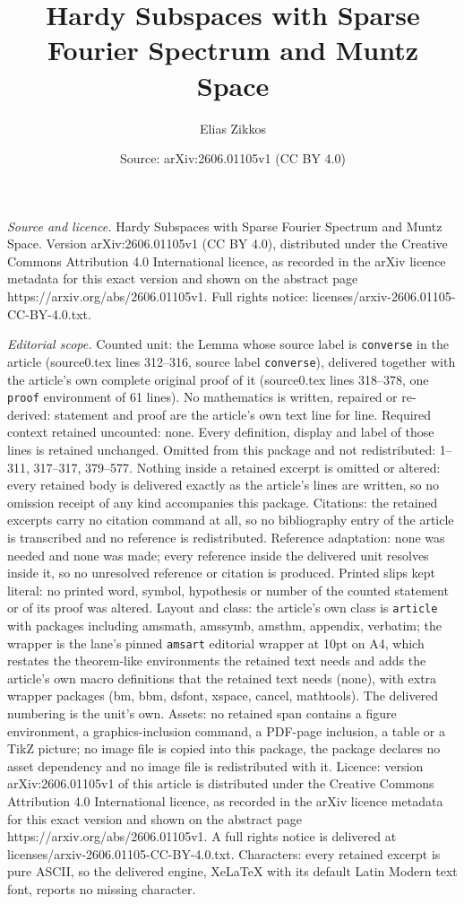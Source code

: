 \documentclass[10pt,a4paper]{amsart}
\title[Hardy Subspaces with Sparse Fourier Spectrum and Muntz Space]{Hardy Subspaces with Sparse Fourier Spectrum and Muntz Space}
\author{Elias Zikkos}
\date{Source: arXiv:2606.01105v1 (CC BY 4.0)}
\begin{document}
\maketitle

\noindent\emph{Source and licence.} Hardy Subspaces with Sparse Fourier Spectrum and Muntz Space. Version arXiv:2606.01105v1 (CC BY 4.0), distributed under the Creative Commons Attribution 4.0 International licence, as recorded in the arXiv licence metadata for this exact version and shown on the abstract page https://arxiv.org/abs/2606.01105v1. Full rights notice: licenses/arxiv-2606.01105-CC-BY-4.0.txt.\par\smallskip

\noindent\textit{Editorial scope.} Counted unit: the Lemma whose source label is \texttt{converse} in the article (source0.tex lines 312--316, source label \texttt{converse}), delivered together with the article's own complete original proof of it (source0.tex lines 318--378, one \texttt{proof} environment of 61 lines). No mathematics is written, repaired or re-derived: statement and proof are the article's own text line for line. Required context retained uncounted: none. Every definition, display and label of those lines is retained unchanged. Omitted from this package and not redistributed: 1--311, 317--317, 379--577. Nothing inside a retained excerpt is omitted or altered: every retained body is delivered exactly as the article's lines are written, so no omission receipt of any kind accompanies this package. Citations: the retained excerpts carry no citation command at all, so no bibliography entry of the article is transcribed and no reference is redistributed. Reference adaptation: none was needed and none was made; every reference inside the delivered unit resolves inside it, so no unresolved reference or citation is produced. Printed slips kept literal: no printed word, symbol, hypothesis or number of the counted statement or of its proof was altered. Layout and class: the article's own class is \texttt{article} with packages including amsmath, amssymb, amsthm, appendix, verbatim; the wrapper is the lane's pinned \texttt{amsart} editorial wrapper at 10pt on A4, which restates the theorem-like environments the retained text needs and adds the article's own macro definitions that the retained text needs (none), with extra wrapper packages (bm, bbm, dsfont, xspace, cancel, mathtools). The delivered numbering is the unit's own. Assets: no retained span contains a figure environment, a graphics-inclusion command, a PDF-page inclusion, a table or a TikZ picture; no image file is copied into this package, the package declares no asset dependency and no image file is redistributed with it. Licence: version arXiv:2606.01105v1 of this article is distributed under the Creative Commons Attribution 4.0 International licence, as recorded in the arXiv licence metadata for this exact version and shown on the abstract page https://arxiv.org/abs/2606.01105v1. A full rights notice is delivered at licenses/arxiv-2606.01105-CC-BY-4.0.txt. Characters: every retained excerpt is pure ASCII, so the delivered engine, XeLaTeX with its default Latin Modern text font, reports no missing character.
\end{document}
